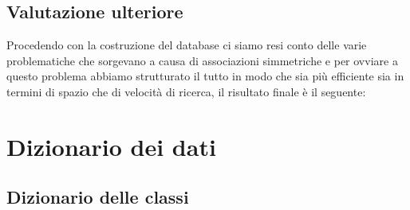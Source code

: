 \documentclass[a4paper]{book}
\begin{document}
    	
    \subsection{Valutazione ulteriore}
    	Procedendo con la costruzione del database ci siamo resi conto delle varie problematiche che sorgevano a causa di associazioni simmetriche e per ovviare a questo problema abbiamo strutturato il tutto in modo che sia più efficiente sia in termini di spazio che di velocità di ricerca, il risultato finale è il seguente:
    	
    	    	
    	\section{Dizionario dei dati}
    
    		\subsection{Dizionario delle classi}
    		
\end{document}

